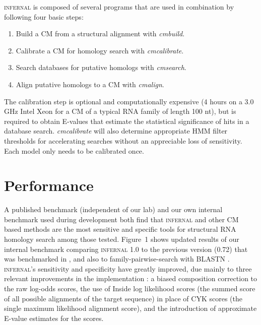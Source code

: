 \documentclass{bioinfo}
\begin{document}
\begin{application}
\textsc{infernal} is composed of several programs that are used in
combination by following four basic steps: 

\begin{enumerate}
\item Build a CM from a structural alignment with \emph{cmbuild}.
\item Calibrate a CM for homology search with \emph{cmcalibrate}.
\item Search databases for putative homologs with \emph{cmsearch}.
\item Align putative homologs to a CM with \emph{cmalign}.
\end{enumerate}

The calibration step is optional and computationally expensive (4
hours on a 3.0 GHz Intel Xeon for a CM of a typical RNA family of
length 100 nt), but is required to obtain E-values that estimate
the statistical significance of hits in a database
search. \emph{cmcalibrate} will also determine appropriate HMM filter
thresholds for accelerating searches without an appreciable loss of
sensitivity. Each model only needs to be calibrated once.


\section{Performance}

A published benchmark (independent of our lab) \citep{Freyhult07} and
our own internal benchmark used during development
\citep{NawrockiEddy07} both find that \textsc{infernal} and other CM
based methods are the most sensitive and specific tools for structural
RNA homology search among those tested. Figure~1 shows updated results
of our internal benchmark comparing \textsc{infernal} 1.0 to the
previous version (0.72) that was benchmarked in \citet{Freyhult07},
and also to family-pairwise-search with BLASTN \citep{Altschul97,
Grundy98b}.  \textsc{infernal}'s sensitivity and specificity have
greatly improved, due mainly to three relevant improvements in the
implementation \citep{infguide03}: a biased composition correction to
the raw log-odds scores, the use of Inside log likelihood scores (the
summed score of all possible alignments of the target sequence) in
place of CYK scores (the single maximum likelihood alignment score),
and the introduction of approximate E-value estimates for the scores.


\end{application}
\end{document}
